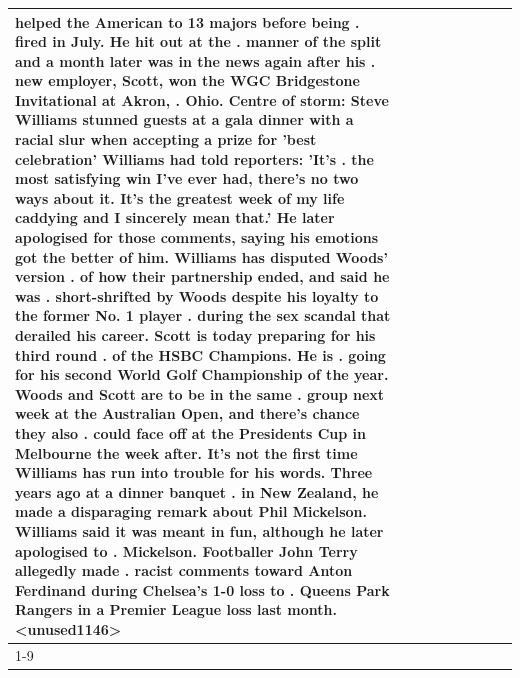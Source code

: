 \begin{table}[H]
\begin{tabular}{lllrlllll}
helped the American to 13 majors before being . fired in July. He hit out at the . manner of the split and a month later was in the news again after his . new employer, Scott, won the WGC Bridgestone Invitational at Akron, . Ohio. Centre of storm: Steve Williams stunned guests at a gala dinner with a racial slur when accepting a prize for 'best celebration' Williams had told reporters: 'It's . the most satisfying win I've ever had, there's no two ways about it. It's the greatest week of my life caddying and I sincerely mean that.' He later apologised for those comments, saying his emotions got the better of him. Williams has disputed Woods' version . of how their partnership ended, and said he was . short-shrifted by Woods despite his loyalty to the former No. 1 player . during the sex scandal that derailed his career. Scott is today preparing for his third round . of the HSBC Champions. He is . going for his second World Golf Championship of the year. Woods and Scott are to be in the same . group next week at the Australian Open, and there's chance they also . could face off at the Presidents Cup in Melbourne the week after. It's not the first time Williams has run into trouble for his words. Three years ago at a dinner banquet . in New Zealand, he made a disparaging remark about Phil Mickelson. Williams said it was meant in fun, although he later apologised to . Mickelson. Footballer John Terry allegedly made . racist comments toward Anton Ferdinand during Chelsea's 1-0 loss to . Queens Park Rangers in a Premier League loss last month.<unused1146> \\
\cline{1-9}

\end{tabular}
\end{table}
